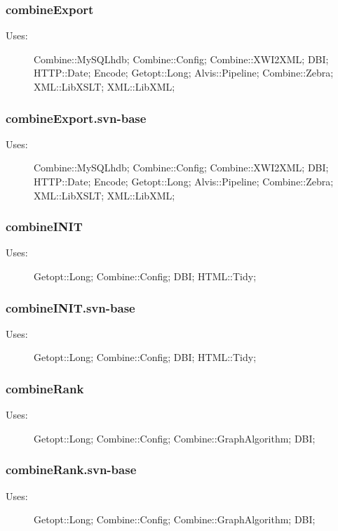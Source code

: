 \subsubsection{combineExport}
\begin{description}
\item[Uses:] Combine::MySQLhdb; Combine::Config; Combine::XWI2XML; DBI; HTTP::Date; Encode; Getopt::Long; Alvis::Pipeline; Combine::Zebra; XML::LibXSLT; XML::LibXML; 

\end{description}
\subsubsection{combineExport.svn-base}
\begin{description}
\item[Uses:] Combine::MySQLhdb; Combine::Config; Combine::XWI2XML; DBI; HTTP::Date; Encode; Getopt::Long; Alvis::Pipeline; Combine::Zebra; XML::LibXSLT; XML::LibXML; 

\end{description}
\subsubsection{combineINIT}
\begin{description}
\item[Uses:] Getopt::Long; Combine::Config; DBI; HTML::Tidy; 

\end{description}
\subsubsection{combineINIT.svn-base}
\begin{description}
\item[Uses:] Getopt::Long; Combine::Config; DBI; HTML::Tidy; 

\end{description}
\subsubsection{combineRank}
\begin{description}
\item[Uses:] Getopt::Long; Combine::Config; Combine::GraphAlgorithm; DBI; 

\end{description}
\subsubsection{combineRank.svn-base}
\begin{description}
\item[Uses:] Getopt::Long; Combine::Config; Combine::GraphAlgorithm; DBI; 

\end{description}

